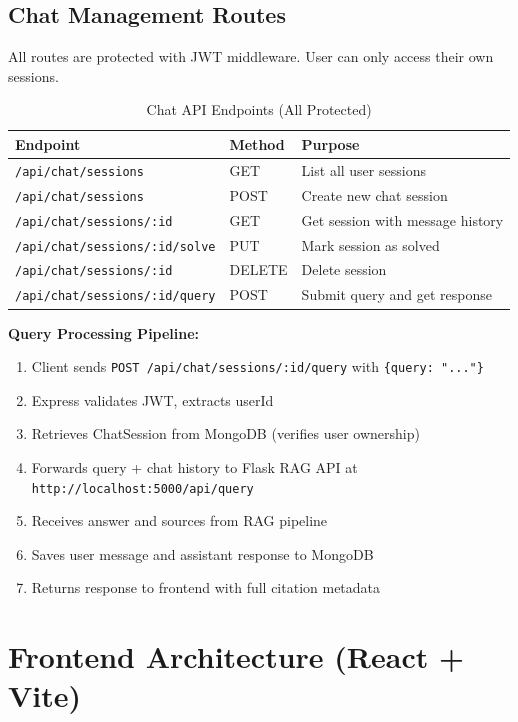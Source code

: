 \documentclass[12pt,a4paper]{article}
\begin{document}
\subsection{Chat Management Routes}

All routes are protected with JWT middleware. User can only access their own sessions.

\begin{table}[H]
\centering
\caption{Chat API Endpoints (All Protected)}
\label{tab:chat_routes}
\begin{tabular}{|l|l|l|}
\hline
\textbf{Endpoint} & \textbf{Method} & \textbf{Purpose} \\
\hline
\texttt{/api/chat/sessions} & GET & List all user sessions \\
\hline
\texttt{/api/chat/sessions} & POST & Create new chat session \\
\hline
\texttt{/api/chat/sessions/:id} & GET & Get session with message history \\
\hline
\texttt{/api/chat/sessions/:id/solve} & PUT & Mark session as solved \\
\hline
\texttt{/api/chat/sessions/:id} & DELETE & Delete session \\
\hline
\texttt{/api/chat/sessions/:id/query} & POST & Submit query and get response \\
\hline
\end{tabular}
\end{table}

\textbf{Query Processing Pipeline:}
\begin{enumerate}
    \item Client sends \texttt{POST /api/chat/sessions/:id/query} with \texttt{\{query: "..."\}}
    \item Express validates JWT, extracts userId
    \item Retrieves ChatSession from MongoDB (verifies user ownership)
    \item Forwards query + chat history to Flask RAG API at \texttt{http://localhost:5000/api/query}
    \item Receives answer and sources from RAG pipeline
    \item Saves user message and assistant response to MongoDB
    \item Returns response to frontend with full citation metadata
\end{enumerate}

\section{Frontend Architecture (React + Vite)}
\end{document}
